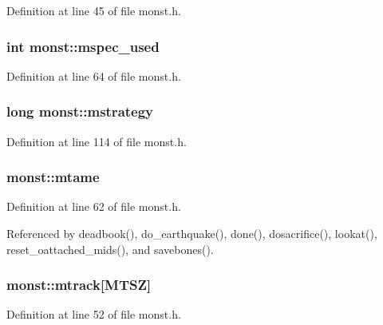 Definition at line 45 of file monst.\+h.

\hypertarget{structmonst_aa3eed6a8c61ab12cb5ae5d1255d3e2eb}{
\subsubsection[{mspec\+\_\+used}]{\setlength{\rightskip}{0pt plus 5cm}int monst\+::mspec\+\_\+used}}\label{structmonst_aa3eed6a8c61ab12cb5ae5d1255d3e2eb}


Definition at line 64 of file monst.\+h.

\hypertarget{structmonst_a5d03af85e4563c4068ac07d616af859f}{
\subsubsection[{mstrategy}]{\setlength{\rightskip}{0pt plus 5cm}long monst\+::mstrategy}}\label{structmonst_a5d03af85e4563c4068ac07d616af859f}


Definition at line 114 of file monst.\+h.

\hypertarget{structmonst_a6d525ec48f9d38cda6accbb0cb39efba}{
\subsubsection[{mtame}]{ monst\+::mtame}}\label{structmonst_a6d525ec48f9d38cda6accbb0cb39efba}


Definition at line 62 of file monst.\+h.



Referenced by deadbook(), do\+\_\+earthquake(), done(), dosacrifice(), lookat(), reset\+\_\+oattached\+\_\+mids(), and savebones().

\hypertarget{structmonst_a14caf00964c088317063abe32aed9eff}{
\subsubsection[{mtrack}]{ monst\+::mtrack\mbox{[}{\bf M\+T\+S\+Z}\mbox{]}}}\label{structmonst_a14caf00964c088317063abe32aed9eff}


Definition at line 52 of file monst.\+h.

